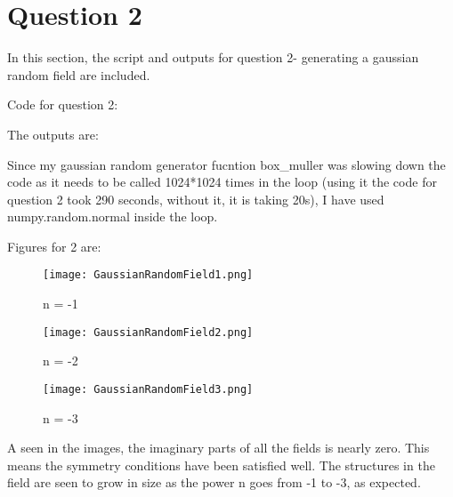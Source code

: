 \section{Question 2}

In this section, the script and outputs for question 2- generating a gaussian random field are included.

Code for question 2:


The outputs are:


Since my gaussian random generator fucntion box\_muller was slowing down the code as it needs to be called 1024*1024 times in the loop (using it the code for question 2 took 290 seconds, without it, it is taking 20s), I have used numpy.random.normal inside the loop. 

Figures for 2 are:
\begin{figure}[h!]
  \centering
  \texttt{[image: GaussianRandomField1.png]}
  \caption{n = -1}
  \label{fig:fig1}
\end{figure}

\begin{figure}[h!]
  \centering
  \texttt{[image: GaussianRandomField2.png]}
  \caption{n = -2}
  \label{fig:fig1}
\end{figure}

\begin{figure}[h!]
  \centering
  \texttt{[image: GaussianRandomField3.png]}
  \caption{n = -3}
  \label{fig:fig1}
\end{figure}


A seen in the images, the imaginary parts of all the fields is nearly zero. This means the symmetry conditions have been satisfied well. The structures in the field are seen to grow in size as the power n goes from -1 to -3, as expected.
